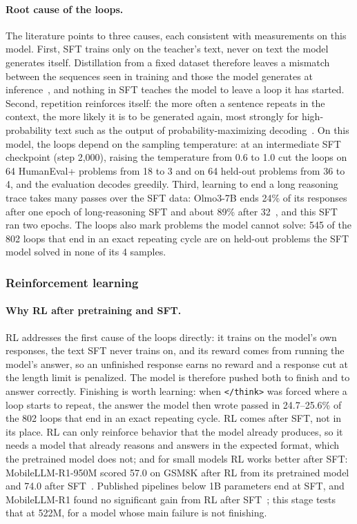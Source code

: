 \documentclass[sigconf,nonacm,balance=false]{acmart}
\begin{document}
\paragraph{Root cause of the loops.} The literature points to three causes, each consistent with measurements on this
model. First, SFT trains only on the teacher's text, never on text the model generates itself. Distillation from a
fixed dataset therefore leaves a mismatch between the sequences seen in training and those the model generates at
inference~\cite{agarwal2024gkd}, and nothing in SFT teaches the model to leave a loop it has started. Second,
repetition reinforces itself: the more often a sentence repeats in the context, the more likely it is to be generated
again, most strongly for high-probability text such as the output of probability-maximizing decoding~\cite{xu2022loop}.
On this model, the loops depend on the sampling temperature: at an
intermediate SFT checkpoint (step 2,000), raising the temperature from 0.6 to 1.0 cut the loops on 64 HumanEval+
problems from 18 to 3 and on 64 held-out problems from 36 to 4, and the evaluation decodes greedily. Third, learning to
end a long reasoning trace takes many passes over the SFT data: Olmo3-7B ends 24\% of its responses after one epoch
of long-reasoning SFT and about 89\% after 32~\cite{kopiczko2026repetition}, and this SFT ran two epochs. The loops
also mark problems the model cannot solve: 545 of the 802 loops that end in an exact repeating cycle are on held-out
problems the SFT model solved in none of its 4 samples.

\subsubsection{Reinforcement learning}
\label{sec:rl}

\paragraph{Why RL after pretraining and SFT\@.} RL addresses the first cause of the loops directly: it trains on the
model's own responses, the text SFT never trains on, and its reward comes from running the model's answer, so an
unfinished response earns no reward and a response cut at the length limit is penalized. The model is therefore
pushed both to finish and to answer correctly. Finishing is worth learning: when \texttt{</think>} was forced where a
loop starts to repeat, the answer the model then wrote passed in 24.7--25.6\% of the 802 loops that end in an exact
repeating cycle. RL comes after SFT, not in its place. RL can only reinforce behavior that the model already produces,
so it needs a model that already reasons and answers in the expected format, which the pretrained model does not; and
for small models RL works better after SFT: MobileLLM-R1-950M scored 57.0 on GSM8K after RL from its pretrained model
and 74.0 after SFT~\cite{zhao2025mobilellmr1}. Published pipelines below 1B parameters end at SFT, and MobileLLM-R1
found no significant gain from RL after SFT~\cite{zhao2025mobilellmr1}; this stage tests that at 522M, for a model
whose main failure is not finishing.
\end{document}

